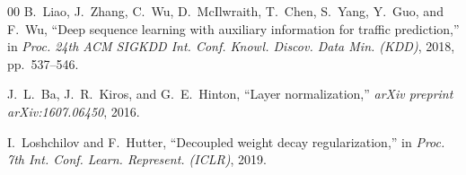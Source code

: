 \documentclass[conference]{IEEEtran}
\begin{document}
\begin{thebibliography}{00}
B.~Liao, J.~Zhang, C.~Wu, D.~McIlwraith, T.~Chen, S.~Yang, Y.~Guo, and F.~Wu, ``Deep sequence learning with auxiliary information for traffic prediction,'' in \emph{Proc. 24th ACM SIGKDD Int. Conf. Knowl. Discov. Data Min. (KDD)}, 2018, pp.~537--546.

J.~L.~Ba, J.~R.~Kiros, and G.~E.~Hinton, ``Layer normalization,'' \emph{arXiv preprint arXiv:1607.06450}, 2016.

I.~Loshchilov and F.~Hutter, ``Decoupled weight decay regularization,'' in \emph{Proc. 7th Int. Conf. Learn. Represent. (ICLR)}, 2019.

\end{thebibliography}
\end{document}
